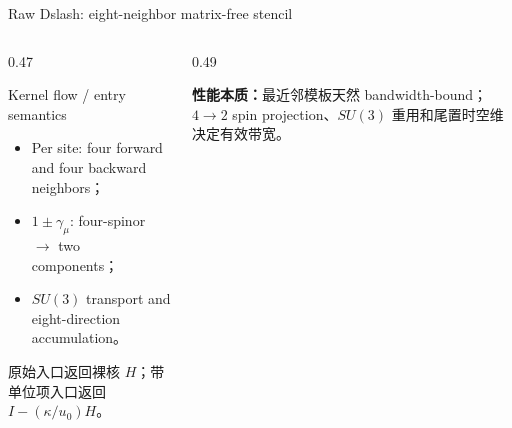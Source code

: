 \documentclass[UTF8,aspectratio=169,11pt,fontset=none]{ctexbeamer}
\begin{document}
\begin{frame}[t]{Raw Dslash: eight-neighbor matrix-free stencil}
\begin{columns}[T,totalwidth=\textwidth]
\begin{column}{0.47\textwidth}
  \begin{block}{Kernel flow / entry semantics}
  \small
  \begin{itemize}
    \item Per site: four forward and four backward neighbors；
    \item \(1\pm\gamma_\mu\): four-spinor \(\to\) two components；
    \item \(SU(3)\) transport and eight-direction accumulation。
  \end{itemize}
  \end{block}
  \small
  原始入口返回裸核 \(H\)；带单位项入口返回
  \(I-(\kappa/u_0)H\)。
\end{column}
\begin{column}{0.49\textwidth}
  \begin{center}
  \end{center}
  \begin{minipage}{0.96\linewidth}
  \small
  \textbf{性能本质：}最近邻模板天然 bandwidth-bound；
  \(4\to2\) spin projection、\(SU(3)\) 重用和尾置时空维决定有效带宽。
  \end{minipage}
\end{column}
\end{columns}
\end{frame}
\end{document}
